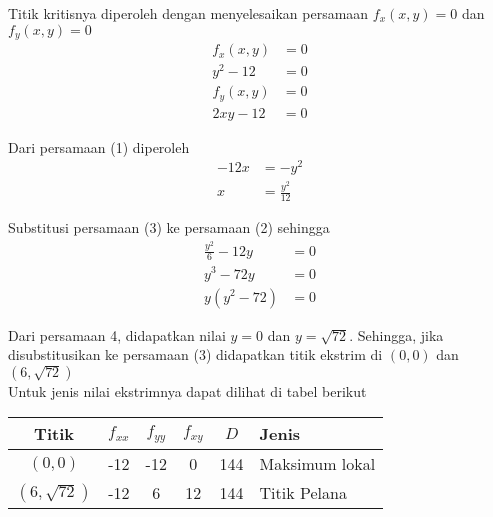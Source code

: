 \documentclass{article}
\begin{document}
    Titik kritisnya diperoleh dengan menyelesaikan persamaan \(f_x(x, y) = 0\) dan \(f_y(x, y) = 0\)
    \begin{equation}
        \begin{split}
            f_x(x, y) & = 0 \\
            y^2 - 12 & = 0
        \end{split}
    \end{equation}
    \begin{equation}
        \begin{split}
            f_y(x, y) & = 0 \\
            2xy- 12 & = 0
        \end{split}
    \end{equation}

    Dari persamaan (1) diperoleh
    \begin{equation}
        \begin{split}
            -12x & = -y^2 \\
            x & = \frac{y^2}{12}
        \end{split}
    \end{equation}

    Substitusi persamaan (3) ke persamaan (2) sehingga
    \begin{equation}
        \begin{split}
            \frac{y^2}{6} - 12y & = 0 \\
            y^3 - 72y & = 0 \\
            y (y^2 - 72) & = 0
        \end{split}
    \end{equation}

    Dari persamaan 4, didapatkan nilai \(y = 0\) dan \(y = \sqrt{72}\).
    Sehingga, jika disubstitusikan ke persamaan (3) didapatkan titik ekstrim di \((0,0)\) dan \((6, \sqrt{72})\) \\

    Untuk jenis nilai ekstrimnya dapat dilihat di tabel berikut
    \begin{table}[h]
        \centering
        \begin{tabular}{c c c c c l}
            \hline
            Titik & \(f_{xx}\) & \(f_{yy}\) & \(f_{xy}\) & \(D\) & Jenis \\ [0ex]
            \hline
            \((0, 0)\) & -12 & -12 & 0 & 144 & Maksimum lokal \\
            \((6, \sqrt{72})\) & -12 & 6 & 12 & 144 & Titik Pelana \\ [0ex]
            \hline
        \end{tabular}
    \end{table}
\end{document}

